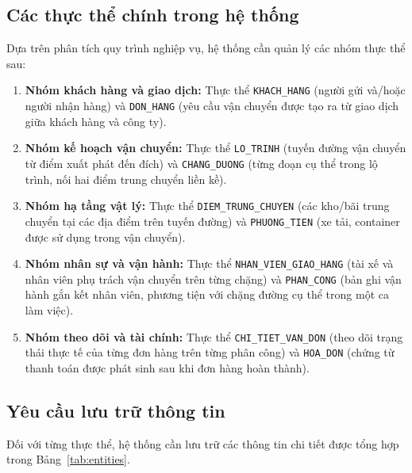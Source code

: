 \documentclass[11pt]{report}
\begin{document}
\subsection{Các thực thể chính trong hệ thống}

Dựa trên phân tích quy trình nghiệp vụ, hệ thống cần quản lý các nhóm thực thể sau:

\begin{enumerate}
    \item \textbf{Nhóm khách hàng và giao dịch:} Thực thể \texttt{KHACH\_HANG} (người gửi và/hoặc người nhận hàng) và \texttt{DON\_HANG} (yêu cầu vận chuyển được tạo ra từ giao dịch giữa khách hàng và công ty).
    
    \item \textbf{Nhóm kế hoạch vận chuyển:} Thực thể \texttt{LO\_TRINH} (tuyến đường vận chuyển từ điểm xuất phát đến đích) và \texttt{CHANG\_DUONG} (từng đoạn cụ thể trong lộ trình, nối hai điểm trung chuyển liền kề).
    
    \item \textbf{Nhóm hạ tầng vật lý:} Thực thể \texttt{DIEM\_TRUNG\_CHUYEN} (các kho/bãi trung chuyển tại các địa điểm trên tuyến đường) và \texttt{PHUONG\_TIEN} (xe tải, container được sử dụng trong vận chuyển).
    
    \item \textbf{Nhóm nhân sự và vận hành:} Thực thể \texttt{NHAN\_VIEN\_GIAO\_HANG} (tài xế và nhân viên phụ trách vận chuyển trên từng chặng) và \texttt{PHAN\_CONG} (bản ghi vận hành gắn kết nhân viên, phương tiện với chặng đường cụ thể trong một ca làm việc).
    
    \item \textbf{Nhóm theo dõi và tài chính:} Thực thể \texttt{CHI\_TIET\_VAN\_DON} (theo dõi trạng thái thực tế của từng đơn hàng trên từng phân công) và \texttt{HOA\_DON} (chứng từ thanh toán được phát sinh sau khi đơn hàng hoàn thành).
\end{enumerate}

\subsection{Yêu cầu lưu trữ thông tin}
Đối với từng thực thể, hệ thống cần lưu trữ các thông tin chi tiết được tổng hợp trong Bảng~\ref{tab:entities}.
\end{document}
